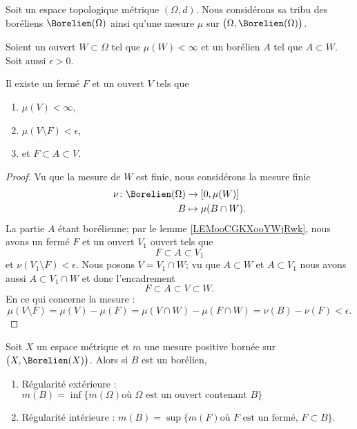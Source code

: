 \begin{lemma}       \label{LEMooZDFVooFUgFGZ}
	Soit un espace topologique métrique \( (\Omega,d)\). Nous considérons sa tribu des boréliens \( \Borelien(\Omega)\) ainsi qu'une mesure \( \mu\) sur \( \big(\Omega,\Borelien(\Omega)\big)\).

	Soient un ouvert \( W\subset \Omega\) tel que \( \mu(W)<\infty\) et un borélien \( A\) tel que \( A\subset W\). Soit aussi \( \epsilon>0\).

	Il existe un fermé \( F\) et un ouvert \( V\) tels que
	\begin{enumerate}
		\item \( \mu(V)<\infty\),
		\item
		      \( \mu(V\setminus F)<\epsilon\),
		\item et \( F\subset A\subset V\).
	\end{enumerate}
\end{lemma}

\begin{proof}
	Vu que la mesure de \( W\) est finie, nous considérons la mesure finie
	\begin{equation}
		\begin{aligned}
			\nu\colon \Borelien(\Omega) & \to \mathopen[ 0 , \mu(W) \mathclose] \\
			B                           & \mapsto \mu(B\cap W).
		\end{aligned}
	\end{equation}
	La partie \( A\) étant borélienne; par le lemme \ref{LEMooCGKXooYWjRwk}, nous avons un fermé \( F\) et un ouvert \( V_1\) ouvert tels que
	\begin{equation}
		F\subset A\subset V_1
	\end{equation}
	et \( \nu(V_1\setminus F)<\epsilon\). Nous posons \( V=V_1\cap W\); vu que \( A\subset W\) et \( A\subset V_1\) nous avons aussi \( A\subset V_1\cap  W\) et donc l'encadrement
	\begin{equation}
		F\subset A\subset V\subset W.
	\end{equation}
	En ce qui concerne la mesure :
	\begin{equation}
		\mu(V\setminus F)=\mu(V)-\mu(F)=\mu(V\cap W)-\mu(F\cap W)=\nu(B)-\nu(F)<\epsilon.
	\end{equation}
\end{proof}

\begin{theorem}     \label{ThoPKGEooVrpsGU}
	Soit \( X\) un espace métrique et \( m\) une mesure positive bornée sur \( \big(X,\Borelien(X)\big)\). Alors si \( B\) est un borélien,
	\begin{enumerate}
		\item
		      Régularité extérieure : \( m(B)=\inf\{ m(\Omega)\text{où } \Omega\text{ est un ouvert contenant } B \}\)
		\item
		      Régularité intérieure : \( m(B)=\sup\{ m(F) \text{où } F\text{ est un fermé, } F\subset B \}\).
	\end{enumerate}
\end{theorem}

